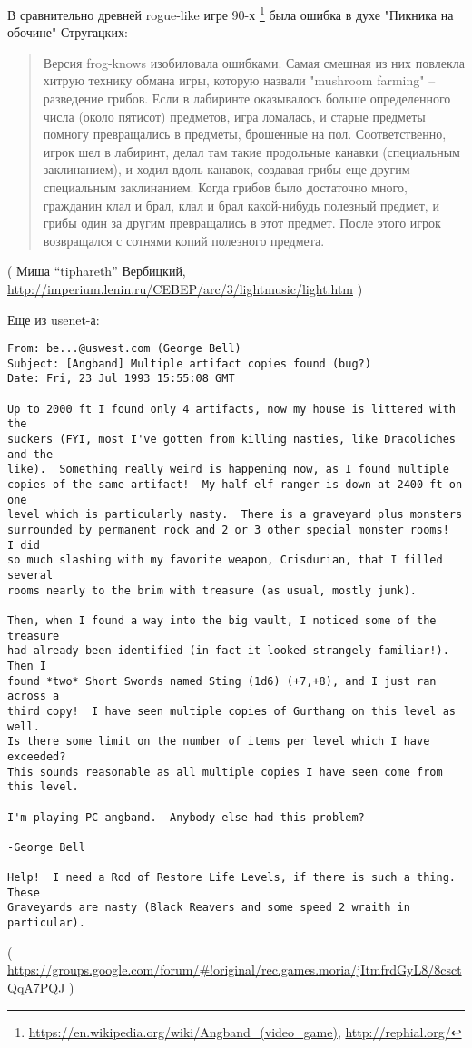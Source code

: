 \label{Angband}

В сравнительно древней rogue-like игре 90-х
\footnote{\url{https://en.wikipedia.org/wiki/Angband_(video_game)}, \url{http://rephial.org/}} была ошибка в духе "Пикника на обочине"
Стругацких:

\begin{framed}
\begin{quotation}
Версия frog-knows изобиловала ошибками. Самая смешная из них повлекла хитрую технику обмана игры, которую назвали "mushroom farming" -- 
разведение грибов. Если в лабиринте оказывалось больше определенного числа (около пятисот) предметов, игра ломалась, 
и старые предметы помногу превращались в предметы, брошенные на пол. Соответственно, игрок шел в лабиринт, 
делал там такие продольные канавки (специальным заклинанием), и ходил вдоль канавок, создавая грибы еще другим специальным заклинанием. 
Когда грибов было достаточно много, гражданин клал и брал, клал и брал какой-нибудь полезный предмет, 
и грибы один за другим превращались в этот предмет. После этого игрок возвращался с сотнями копий полезного предмета. 
\end{quotation}
\end{framed}
( Миша ``tiphareth'' Вербицкий, \url{http://imperium.lenin.ru/CEBEP/arc/3/lightmusic/light.htm} )

Еще из usenet-а:

\begin{lstlisting}
From: be...@uswest.com (George Bell)
Subject: [Angband] Multiple artifact copies found (bug?)
Date: Fri, 23 Jul 1993 15:55:08 GMT

Up to 2000 ft I found only 4 artifacts, now my house is littered with the
suckers (FYI, most I've gotten from killing nasties, like Dracoliches and the
like).  Something really weird is happening now, as I found multiple
copies of the same artifact!  My half-elf ranger is down at 2400 ft on one
level which is particularly nasty.  There is a graveyard plus monsters
surrounded by permanent rock and 2 or 3 other special monster rooms!  I did
so much slashing with my favorite weapon, Crisdurian, that I filled several
rooms nearly to the brim with treasure (as usual, mostly junk).

Then, when I found a way into the big vault, I noticed some of the treasure
had already been identified (in fact it looked strangely familiar!).  Then I
found *two* Short Swords named Sting (1d6) (+7,+8), and I just ran across a
third copy!  I have seen multiple copies of Gurthang on this level as well.
Is there some limit on the number of items per level which I have exceeded?
This sounds reasonable as all multiple copies I have seen come from this level.

I'm playing PC angband.  Anybody else had this problem?

-George Bell

Help!  I need a Rod of Restore Life Levels, if there is such a thing.  These
Graveyards are nasty (Black Reavers and some speed 2 wraith in particular). 
\end{lstlisting}
( \url{https://groups.google.com/forum/#!original/rec.games.moria/jItmfrdGyL8/8csctQqA7PQJ} )

